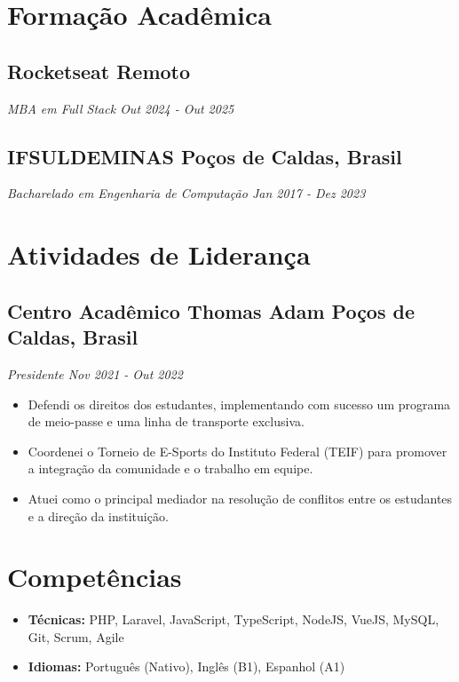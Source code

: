 \documentclass[a4paper,10pt]{article}
\begin{document}
\section{Formação Acadêmica}
    \subsection*{\texorpdfstring{
        \textbf{Rocketseat} \hfill Remoto
        }{
        Rocketseat -- Remoto 
        }}
    \textit{MBA em Full Stack \hfill Out 2024 - Out 2025}
    \subsection*{\texorpdfstring{
        \textbf{IFSULDEMINAS} \hfill Poços de Caldas, Brasil
        }{
        IFSULDEMINAS -- Poços de Caldas, Brasil
        }}
    \textit{Bacharelado em Engenharia de Computação \hfill Jan 2017 - Dez 2023}

\section{Atividades de Liderança} 
    \subsection*{\texorpdfstring{
        \textbf{Centro Acadêmico Thomas Adam} \hfill Poços de Caldas, Brasil
        }{
        Centro Acadêmico Thomas Adam -- Poços de Caldas, Brasil
        }}
    \textit{Presidente \hfill Nov 2021 - Out 2022}
        \begin{itemize}
            \item Defendi os direitos dos estudantes, implementando com sucesso um programa de meio-passe e uma linha de transporte exclusiva.
            \item Coordenei o Torneio de E-Sports do Instituto Federal (TEIF) para promover a integração da comunidade e o trabalho em equipe.
            \item Atuei como o principal mediador na resolução de conflitos entre os estudantes e a direção da instituição.
        \end{itemize}

\section{Competências}
    \begin{itemize}
        \item \textbf{Técnicas:} PHP, Laravel, JavaScript, TypeScript, NodeJS, VueJS, MySQL, Git, Scrum, Agile
        \item \textbf{Idiomas:} Português (Nativo), Inglês (B1), Espanhol (A1)
    \end{itemize}
\end{document}
